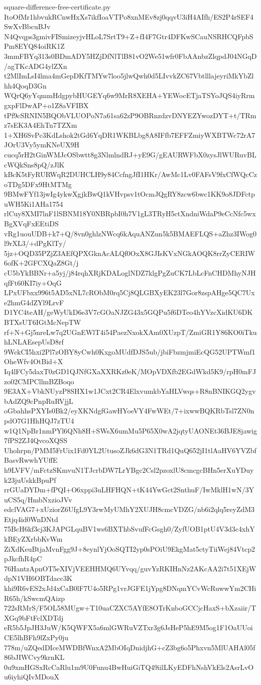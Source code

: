 \documentclass[11pt]{article}
\theoremstyle{definition}
\theoremstyle{remark}
\begin{document}
\begin{filecontents*}[overwrite]{square-difference-free-certificate.py}
ItoOfMr1hbvukRCnwHxXs7ikfIoaVTPo8xnMEv8zj0qqvU3iH4AIfh/ES2P4rSEF4SwXvBbcuBJv
N4Qvqps3gmivFISmizeyjvHLoL7SrtT9+Z+fI4F7Gtr4DFKwSCauNSRHCQFpbSPm8EYQ84oiRK1Z
3mmFBYq313s0BDmADY5HZjDfNlTlB81vO2We51wfr0FbAAnbzZlqpdJ04NGqD/agTKcADG4ylZXn
t2MlImLsI4lma4mGepDKfTMYw7loo5jlwQwh0d5LIvvkZC67VbtlllajeyriMkYbZlhh4QoqD3Gn
WQrQ6yYqmmHdgpybHUGEYq6w9MrR8XEHA+YEWocETjaTSYoJQS4iyRrmgxpFlDwAP+o1Z8aVFIBX
tPf9cSRNIN5BQObVLUOPoN7a61sa62zP9OBRnzdzvDNYEZYwozDYT+t/TRmz7sEK3A4EhTn7TZXm
1+XH6SvPc3KdLshok2tGd6YqDR1WKBLbg8A8IFfb7EFFZmiyWXBTWc72rA7JOrU3Vy5ymKNeUX9H
cucq5rH2tGinWMJcOSbwtt8g3NlmlndRJ+yE9G/gEAURWFbX0zysJlWURuvBLcWQkSns8pQ/zJlK
kBcK5tFyRURWqR2DUHCLH9y84CcfngJfI1HKr/AwMc1Lv0FAFsV9fxCfWQcCzoTDg5DFx9HtMTMg
9BMwFYf13jwIg4ykwXgjkBwQ1kVHvpsv1tOcmJQgRY8zcw6bwc1KK9o8JDFctpuWH5Ki1AHa1754
rlCuy8XMI7lnF1lSBNM18Y0NBRpbI0h7V1gL3TRyH5ctXndniWdaP9eCcNfc5wxBgXVqFxEEtiDS
vRg1uouUDB+k7+Q/8vn0ghlzNWcq6kAquANZun5k5BMAEFLQS+aZhz3IWog0l9rXL3/+dPgKlTy/
5jz+OQD35PZjZ3AEfQPXGknAcALQf0OxX8GJIsKVxNGkAOQK8rrZyCERIW6ofK+2GFCXQaZ8Gt/j
cU5bYkBBNr+a5yj/j84rqhXRjKDALoglNDZ7klgPgZuCK7LbLcFnCHDMhyNJHqfFt60KI7iy+OqG
LPxUFbxx996t5AD5xNL7cRObM0rq5Cj8QLGBXyEK23l7Gor8zspAHge5QC7Uxe2hmG4dZYl9LrvF
D1YC4teAH/geWyUkD6e3V7cGOaNJZG43x5GQPu5f6DTeo4hYVzcXidKU6DKBTXsUT6IGtMcNepTW
rf+N+Gj5nreLw7q2UGnEWlT4i54PaezNxokXAm0XUzpT/ZmiGR1Y86KO0iTkuhLNLAEsepUsD8rf
9WckCI5hxi2Pl7zOBY8yCwh0KxgoMUdfDJS5ub/jbiFbzmjmiEcQG52UPTWmf1OheWfv4OtBid+X
Iq4lFCy5daxT0zGD1QJNfGXaXXRKz0eK/MOpVDXfb2EGdWkd5K9/rpH0mFJzo02CMPCllmBZBoqo
9E3AX+VbkNUyzP8SHX1w1JCxt2CR4ElxvumkbYaHLVwqs+R8nBNIKGQ2ygvbAdZQ9cPnpRuRVjjL
oGbahhsPXYIs0Bk2/eyXKNdgfGawHYoeVY4FwWEt/7+ixwwBQKRbTsl7ZN0npdO7G1HhHQJ7zTU4
w1Q1NpBr1nmPYl6QNh8H+SWsX6umMu5P65X0wA2jqtyUAONEt36BJE8jawig7fPS2ZJ4QvcoXQSS
Uhohrpn/PMM5FrUix1Fd0YL2UtusoZJk6dG3N1TRd1QuQ652jI1tlAaHV6YVZbfBasvRwwhYUffE
h9LVFV/mFctzSKmvuN1TJcrbDW7LrYBgc2Csl2pzoxlU8cmcgcBHn5erXuYDuyk23juUskkBpuPf
rrGUaDYDm+fPQI+O6xppi3uLHFHQN+tK44YwGct2SnthuF/IwMklH1wN/3YuCS5q/HmbNxzioJVv
edclVAG7+xUziorZ6UfgL9Y3rwMyUMhY2XUJH8cmcVDZG/nb6i2qlq5reyZdM3Etjq4id0WnDNtd
75BcH6kf3cj3KJAPGLquBV1ws6BXThbSvufFcGsgh0/ZyfUOB1ptU4V3d3c4xhYkBEyZXrbbKvWm
ZiXdKeuBtjaMvnFgg9J+8eynlYjOoSQTI2yp0sPOiU9EkgMat5ctyTiiWej84Vtcp2pJkcfhR4pC
76HantzApnOT5eXIVjVEEHHMQ6UYvqq/guvYzRKIHnNz2AKcAA2i7t51XEjWdpN1VH6OBTdacc3K
khi9R6vES2xJd4xCaB0lF7U4o5RPg1vrJGFE1jYpg8DNqmYCvWcRuwwYm2CHiR65h/kSwcmQAizp
722sRMrS/F5OL58MUgw+T10uaCZXC5AYfE8OTrKnboGCCjcHaxS+bXzaiir/TXGq9bFtFclXDTdj
eR5b5JpJH3JuW/K5QWFX5a6mlGWRuVZTxr3g6JsHeP5hE9M5og1F1OaUUoiCE5lhBFh9lZxPy0ju
778m/uZQedDIceMWDBfWnxA2MbOIqDnidjhG+cZ3bg6o5Phxvn5MlUAHAl05f86bJIWCvy9krnKL
0u9xmHGSxRcCaRlu1m9U0Funu4BwHuiGiTQ49iilLKyEDFhNshVkEls2AsrLvOu6iyhiQIvMDouX

\end{filecontents*}
\end{document}
